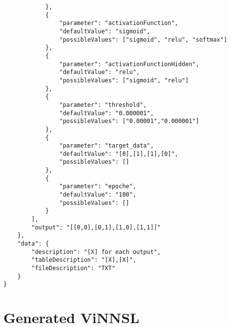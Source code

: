 \begin{lstlisting}
			},
			{
				"parameter": "activationFunction",
				"defaultValue": "sigmoid",
				"possibleValues": ["sigmoid", "relu", "softmax"]
			},
			{
				"parameter": "activationFunctionHidden",
				"defaultValue": "relu",
				"possibleValues": ["sigmoid", "relu"]
			},
			{
				"parameter": "threshold",
				"defaultValue": "0.000001",
				"possibleValues": ["0.00001","0.000001"]
			},
			{
				"parameter": "target_data",
				"defaultValue": "[0],[1],[1],[0]",
				"possibleValues": []
			},
			{
				"parameter": "epoche",
				"defaultValue": "100",
				"possibleValues": []
			}
		],
		"output": "[[0,0],[0,1],[1,0],[1,1]]"
	},
	"data": {
		"description": "[X] for each output",
		"tableDescription": "[X],[X]",
		"fileDescription": "TXT"
	}
}
\end{lstlisting}

\section{Generated ViNNSL}\label{B}
